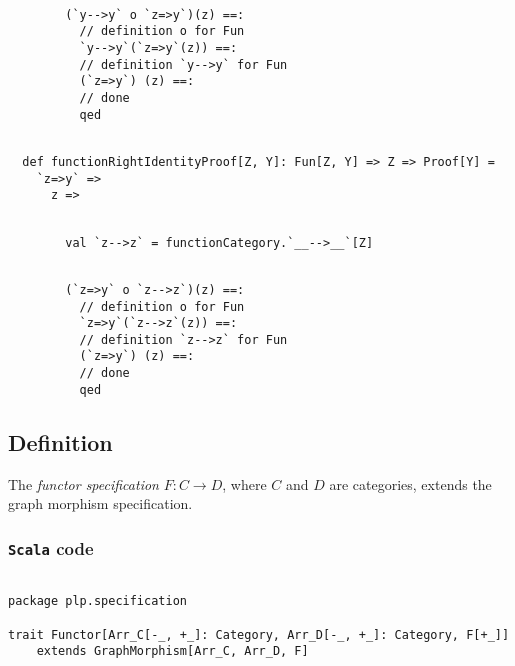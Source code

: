 \documentclass[11pt]{article}
\newcommand{\functor}[2]{#1 \rightarrow #2}
\newcommand{\defn}{\subsection{Definition}\begingroup\rm}
\newcommand{\code}{\subsubsection{{\tt Scala} code}\begingroup\rm \vspace{12pt}}
\def\edefn{\endgroup\par\pagebreak[2]\addvspace{\medskipamount}}
\let\ecode=\edefn
\begin{document}
\vspace{6pt}
\begin{mdframed}[backgroundcolor=lightgray!20] 
\begin{lstlisting}
              
        (`y-->y` o `z=>y`)(z) ==:
          // definition o for Fun
          `y-->y`(`z=>y`(z)) ==:
          // definition `y-->y` for Fun
          (`z=>y`) (z) ==:
          // done
          qed
\end{lstlisting}
\end{mdframed}
\vspace{6pt}
\begin{mdframed}[backgroundcolor=lightgray!20] 
\begin{lstlisting}
   
  def functionRightIdentityProof[Z, Y]: Fun[Z, Y] => Z => Proof[Y] =
    `z=>y` =>
      z =>
\end{lstlisting}
\end{mdframed}
\vspace{6pt}
\begin{mdframed}[backgroundcolor=lightgray!20] 
\begin{lstlisting}

        val `z-->z` = functionCategory.`__-->__`[Z]
\end{lstlisting}
\end{mdframed}
\vspace{6pt}
\begin{mdframed}[backgroundcolor=lightgray!20] 
\begin{lstlisting}
        
        (`z=>y` o `z-->z`)(z) ==:
          // definition o for Fun
          `z=>y`(`z-->z`(z)) ==:
          // definition `z-->z` for Fun
          (`z=>y`) (z) ==:
          // done
          qed
\end{lstlisting}
\end{mdframed}
\ecode

\defn\label{functor specification}
The {\em functor specification} $F: \functor{C}{D}$, where $C$ and $D$ are categories,
extends the graph morphism specification.
\edefn

\code
\begin{mdframed}[backgroundcolor=lightgray!20] 
\begin{lstlisting}

package plp.specification

trait Functor[Arr_C[-_, +_]: Category, Arr_D[-_, +_]: Category, F[+_]]
    extends GraphMorphism[Arr_C, Arr_D, F]
\end{lstlisting}
\end{mdframed}
\ecode
\end{document}
